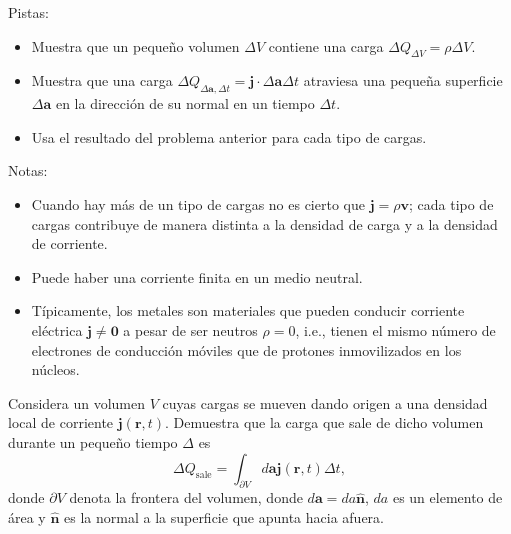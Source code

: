 \documentclass{exam}
\begin{document}
\begin{questions}

    Pistas:
    \begin{itemize}
    \item Muestra que un pequeño volumen $\Delta V$ contiene una carga
      $\Delta Q_{\Delta V}=\rho\Delta V$.
    \item Muestra que una carga $\Delta Q_{\Delta \bm a,\Delta t}=\bm
      j\cdot\Delta\bm a\Delta t$ atraviesa una pequeña superficie
      $\Delta \bm a$ en la dirección de su normal en un tiempo $\Delta t$.
    \item Usa el resultado del problema anterior para cada tipo de cargas.
    \end{itemize}

    Notas:
    \begin{itemize}
    \item Cuando hay más de un tipo de cargas no es cierto que $\bm
      j=\rho \bm v$; cada tipo de cargas contribuye de manera distinta
      a la densidad de carga y a la densidad de corriente.
    \item Puede haber una corriente finita en un medio neutral.
    \item Típicamente, los metales son materiales que pueden conducir
      corriente eléctrica $\bm j\ne \bm 0$ a pesar de ser neutros
      $\rho=0$, i.e., tienen el mismo número de electrones de
      conducción móviles que de protones inmovilizados en los núcleos.
    \end{itemize}
  \question Considera un volumen $V$ cuyas cargas se mueven dando
    origen a una densidad local de corriente $\bm j(\bm
    r,t)$. Demuestra que la carga que sale de dicho volumen durante un
    pequeño tiempo $\Delta$ es
    $$
    \Delta Q_{\mathrm{sale}}=\int_{\partial V}d\bm a \bm j(\bm r, t) \Delta t,
    $$
    donde $\partial V$ denota la frontera del volumen, donde $d\bm
    a=da\hat{\bm n}$, $da$ es un elemento de área y $\hat{\bm n}$ es
    la normal a la superficie que apunta hacia afuera.


\end{questions}
\end{document}
